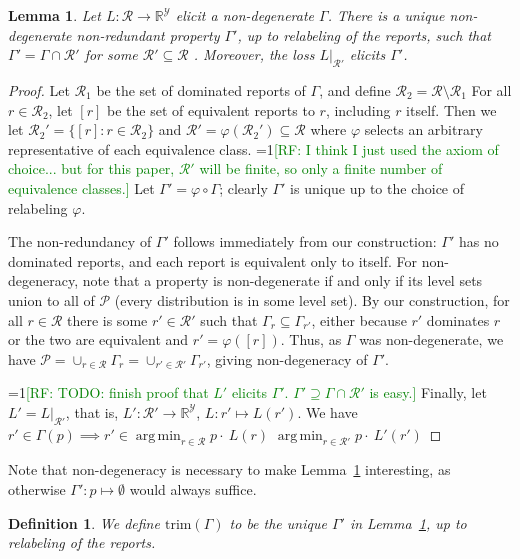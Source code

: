 \documentclass[11pt]{article}
\newcommand{\Comments}{1}
\newcommand{\mynote}[2]{\ifnum\Comments=1\textcolor{#1}{#2}\fi}
\newcommand{\raf}[1]{\mynote{green}{[RF: #1]}}
\newcommand{\reals}{\mathbb{R}}
\renewcommand{\P}{\mathcal{P}}
\newcommand{\R}{\mathcal{R}}
\newcommand{\Y}{\mathcal{Y}}
\renewcommand{\P}{\mathcal{P}}
\newcommand{\trim}{\mathrm{trim}}
\DeclareMathOperator*{\argmin}{arg\,min}
\newtheorem{lemma}{Lemma}
\newtheorem{definition}{Definition}
\begin{document}
\begin{lemma}\label{lem:trim}
  Let $L:\R\to\reals^\Y$ elicit a non-degenerate $\Gamma$.
  There is a unique non-degenerate non-redundant property $\Gamma'$, up to relabeling of the reports, such that $\Gamma' = \Gamma\cap\R'$ for some $\R'\subseteq\R$ .
  Moreover, the loss $L|_{\R'}$ elicits $\Gamma'$.
\end{lemma}
\begin{proof}
  Let $\R_1$ be the set of dominated reports of $\Gamma$, and define $\R_2 = \R\setminus\R_1$
  For all $r \in \R_2$, let $[r]$ be the set of equivalent reports to $r$, including $r$ itself.
  Then we let $\R_2' = \{[r] : r\in\R_2\}$ and $\R' = \varphi(\R_2') \subseteq \R$ where $\varphi$ selects an arbitrary representative of each equivalence class.
  \raf{I think I just used the axiom of choice... but for this paper, $\R'$ will be finite, so only a finite number of equivalence classes.}
  Let $\Gamma' = \varphi \circ \Gamma$; clearly $\Gamma'$ is unique up to the choice of relabeling $\varphi$.

  The non-redundancy of $\Gamma'$ follows immediately from our construction: $\Gamma'$ has no dominated reports, and each report is equivalent only to itself.
  For non-degeneracy, note that a property is non-degenerate if and only if its level sets union to all of $\P$ (every distribution is in some level set).
  By our construction, for all $r\in\R$ there is some $r'\in\R'$ such that $\Gamma_{r} \subseteq \Gamma_{r'}$, either because $r'$ dominates $r$ or the two are equivalent and $r' = \varphi([r])$.
  Thus, as $\Gamma$ was non-degenerate, we have $\P = \cup_{r\in\R} \Gamma_r = \cup_{r'\in\R'} \Gamma_{r'}$, giving non-degeneracy of $\Gamma'$.

\raf{TODO: finish proof that $L'$ elicits $\Gamma'$.  $\Gamma' \supseteq \Gamma \cap \R'$ is easy.}
  Finally, let $L' = L|_{\R'}$, that is, $L':\R'\to\reals^\Y$, $L:r'\mapsto L(r')$.
  We have $r' \in \Gamma(p) \implies r' \in \argmin_{r\in\R} p\cdot~L(r)$ $ \argmin_{r\in\R'} p\cdot~L'(r') $
\end{proof}
Note that non-degeneracy is necessary to make Lemma~\ref{lem:trim} interesting, as otherwise $\Gamma' : p \mapsto \emptyset$ would always suffice.


\begin{definition}\label{def:trim}
  We define $\trim(\Gamma)$ to be the unique $\Gamma'$ in Lemma~\ref{lem:trim}, up to relabeling of the reports.
\end{definition}
\end{document}
